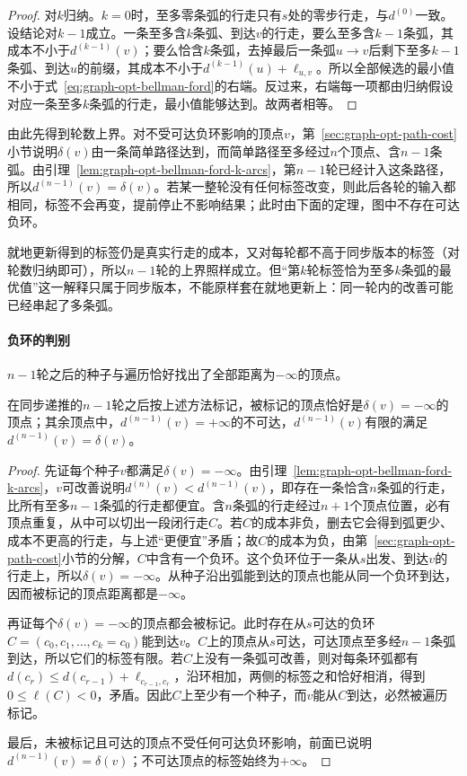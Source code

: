 \begin{proof}
对$k$归纳。$k=0$时，至多零条弧的行走只有$s$处的零步行走，与$d^{(0)}$一致。设结论对$k-1$成立。一条至多含$k$条弧、到达$v$的行走，要么至多含$k-1$条弧，其成本不小于$d^{(k-1)}(v)$；要么恰含$k$条弧，去掉最后一条弧$u\to v$后剩下至多$k-1$条弧、到达$u$的前缀，其成本不小于$d^{(k-1)}(u)+\ell_{u,v}$。所以全部候选的最小值不小于式~\eqref{eq:graph-opt-bellman-ford}的右端。反过来，右端每一项都由归纳假设对应一条至多$k$条弧的行走，最小值能够达到。故两者相等。
\end{proof}

由此先得到轮数上界。对不受可达负环影响的顶点$v$，第~\ref{sec:graph-opt-path-cost}小节说明$\delta(v)$由一条简单路径达到，而简单路径至多经过$n$个顶点、含$n-1$条弧。由引理~\ref{lem:graph-opt-bellman-ford-k-arcs}，第$n-1$轮已经计入这条路径，所以$d^{(n-1)}(v)=\delta(v)$。若某一整轮没有任何标签改变，则此后各轮的输入都相同，标签不会再变，提前停止不影响结果；此时由下面的定理，图中不存在可达负环。

就地更新得到的标签仍是真实行走的成本，又对每轮都不高于同步版本的标签（对轮数归纳即可），所以$n-1$轮的上界照样成立。但“第$k$轮标签恰为至多$k$条弧的最优值”这一解释只属于同步版本，不能原样套在就地更新上：同一轮内的改善可能已经串起了多条弧。

\paragraph{负环的判别}
$n-1$轮之后的种子与遍历恰好找出了全部距离为$-\infty$的顶点。

\begin{theorem}
\label{thm:graph-opt-bellman-ford-negative-cycles}
在同步递推的$n-1$轮之后按上述方法标记，被标记的顶点恰好是$\delta(v)=-\infty$的顶点；其余顶点中，$d^{(n-1)}(v)=+\infty$的不可达，$d^{(n-1)}(v)$有限的满足$d^{(n-1)}(v)=\delta(v)$。
\end{theorem}

\begin{proof}
先证每个种子$v$都满足$\delta(v)=-\infty$。由引理~\ref{lem:graph-opt-bellman-ford-k-arcs}，$v$可改善说明$d^{(n)}(v)<d^{(n-1)}(v)$，即存在一条恰含$n$条弧的行走，比所有至多$n-1$条弧的行走都便宜。含$n$条弧的行走经过$n+1$个顶点位置，必有顶点重复，从中可以切出一段闭行走$C$。若$C$的成本非负，删去它会得到弧更少、成本不更高的行走，与上述“更便宜”矛盾；故$C$的成本为负，由第~\ref{sec:graph-opt-path-cost}小节的分解，$C$中含有一个负环。这个负环位于一条从$s$出发、到达$v$的行走上，所以$\delta(v)=-\infty$。从种子沿出弧能到达的顶点也能从同一个负环到达，因而被标记的顶点距离都是$-\infty$。

再证每个$\delta(v)=-\infty$的顶点都会被标记。此时存在从$s$可达的负环$C=(c_0,c_1,\ldots,c_k=c_0)$能到达$v$。$C$上的顶点从$s$可达，可达顶点至多经$n-1$条弧到达，所以它们的标签有限。若$C$上没有一条弧可改善，则对每条环弧都有$d(c_{r})\leq d(c_{r-1})+\ell_{c_{r-1},c_r}$，沿环相加，两侧的标签之和恰好相消，得到$0\leq\ell(C)<0$，矛盾。因此$C$上至少有一个种子，而$v$能从$C$到达，必然被遍历标记。

最后，未被标记且可达的顶点不受任何可达负环影响，前面已说明$d^{(n-1)}(v)=\delta(v)$；不可达顶点的标签始终为$+\infty$。
\end{proof}


